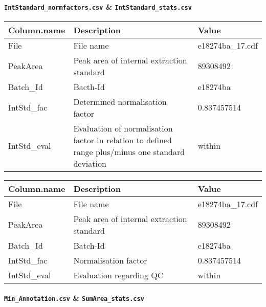 \documentclass[]{book}
\let\oldparagraph\paragraph
\renewcommand{\paragraph}[1]{\oldparagraph{#1}\mbox{}}
\begin{document}
\hypertarget{intstandard_normfactors.csv-intstandard_stats.csv}{%
\paragraph{\texorpdfstring{\texttt{IntStandard\_normfactors.csv} \& \texttt{IntStandard\_stats.csv}}{IntStandard\_normfactors.csv \& IntStandard\_stats.csv}}\label{intstandard_normfactors.csv-intstandard_stats.csv}}

\begin{tabu} to 
\toprule
Column.name & Description & Value\\
\midrule
{}  File & File name & e18274ba\_17.cdf\\
PeakArea & Peak area of internal extraction standard & 89308492\\
  Batch\_Id & Bacth-Id & e18274ba\\
IntStd\_fac & Determined normalisation factor & 0.837457514\\
  IntStd\_eval & Evaluation of normalisation factor in relation to defined range plus/minus one standard deviation & within\\
\bottomrule
\end{tabu}

\begin{tabu} to 
\toprule
Column.name & Description & Value\\
\midrule
{}  File & File name & e18274ba\_17.cdf\\
PeakArea & Peak area of internal extraction standard & 89308492\\
  Batch\_Id & Batch-Id & e18274ba\\
IntStd\_fac & Normalisation factor & 0.837457514\\
  IntStd\_eval & Evaluation regarding QC & within\\
\bottomrule
\end{tabu}

\hypertarget{min_annotation.csv-sumarea_stats.csv}{%
\paragraph{\texorpdfstring{\texttt{Min\_Annotation.csv} \& \texttt{SumArea\_stats.csv}}{Min\_Annotation.csv \& SumArea\_stats.csv}}\label{min_annotation.csv-sumarea_stats.csv}}
\end{document}
